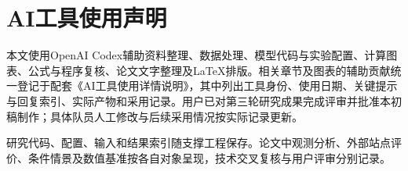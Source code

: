 \section*{AI工具使用声明}
本文使用OpenAI Codex辅助资料整理、数据处理、模型代码与实验配置、计算图表、公式与程序复核、论文文字整理及LaTeX排版\cite{common-openai}。相关章节及图表的辅助贡献统一登记于配套《AI工具使用详情说明》，其中列出工具身份、使用日期、关键提示与回复索引、实际产物和采用记录。用户已对第三轮研究成果完成评审并批准本初稿制作；具体队员人工修改与后续采用情况按实际记录更新。

研究代码、配置、输入和结果索引随支撑工程保存。论文中观测分析、外部站点评价、条件情景及数值基准按各自对象呈现，技术交叉复核与用户评审分别记录。
